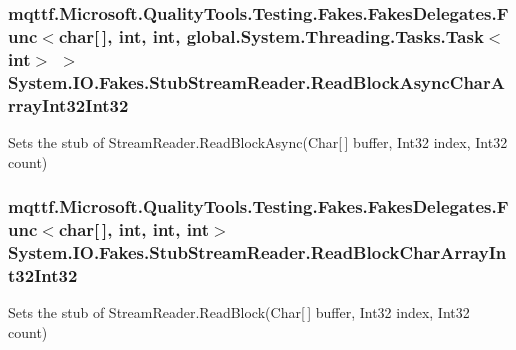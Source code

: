 \hypertarget{class_system_1_1_i_o_1_1_fakes_1_1_stub_stream_reader_aa9c625c692465d8dbc2432cd7d784add}{
\subsubsection[{Read\-Block\-Async\-Char\-Array\-Int32\-Int32}]{\setlength{\rightskip}{0pt plus 5cm}mqttf.\-Microsoft.\-Quality\-Tools.\-Testing.\-Fakes.\-Fakes\-Delegates.\-Func$<$char\mbox{[}$\,$\mbox{]}, int, int, global.\-System.\-Threading.\-Tasks.\-Task$<$int$>$ $>$ System.\-I\-O.\-Fakes.\-Stub\-Stream\-Reader.\-Read\-Block\-Async\-Char\-Array\-Int32\-Int32}}\label{class_system_1_1_i_o_1_1_fakes_1_1_stub_stream_reader_aa9c625c692465d8dbc2432cd7d784add}


Sets the stub of Stream\-Reader.\-Read\-Block\-Async(\-Char\mbox{[}$\,$\mbox{]} buffer, Int32 index, Int32 count)

\hypertarget{class_system_1_1_i_o_1_1_fakes_1_1_stub_stream_reader_afb7db40473d45423b575b9470c41a94d}{
\subsubsection[{Read\-Block\-Char\-Array\-Int32\-Int32}]{\setlength{\rightskip}{0pt plus 5cm}mqttf.\-Microsoft.\-Quality\-Tools.\-Testing.\-Fakes.\-Fakes\-Delegates.\-Func$<$char\mbox{[}$\,$\mbox{]}, int, int, int$>$ System.\-I\-O.\-Fakes.\-Stub\-Stream\-Reader.\-Read\-Block\-Char\-Array\-Int32\-Int32}}\label{class_system_1_1_i_o_1_1_fakes_1_1_stub_stream_reader_afb7db40473d45423b575b9470c41a94d}


Sets the stub of Stream\-Reader.\-Read\-Block(\-Char\mbox{[}$\,$\mbox{]} buffer, Int32 index, Int32 count)

